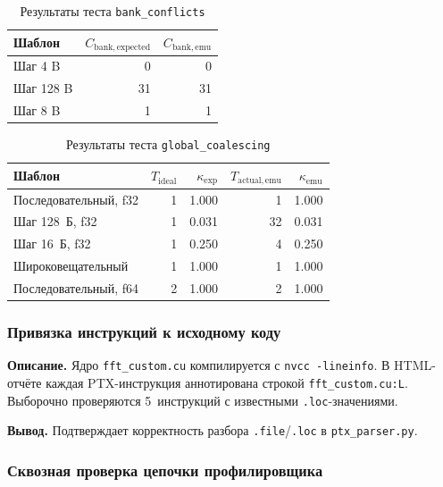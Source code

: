 \begin{table}[h]
  \caption{Результаты теста \texttt{bank\_conflicts}}
  \label{tab:bank_conflicts_test}
  \centering
  \begin{tabular}{lrr}
    \toprule
    \textbf{Шаблон} & $C_{\mathrm{bank,expected}}$ & $C_{\mathrm{bank,emu}}$ \\
    \midrule
    Шаг 4 B    & 0  & 0  \\
    Шаг 128 B  & 31 & 31 \\
    Шаг 8 B    & 1  & 1  \\
    \bottomrule
  \end{tabular}
\end{table}

\begin{table}[h]
  \caption{Результаты теста \texttt{global\_coalescing}}
  \label{tab:coalescing_test}
  \centering
  \begin{tabular}{lrrrr}
    \toprule
    \textbf{Шаблон} & $T_{\mathrm{ideal}}$ & $\kappa_{\mathrm{exp}}$ &
    $T_{\mathrm{actual,emu}}$ & $\kappa_{\mathrm{emu}}$ \\
    \midrule
    Последовательный, f32 & 1 & 1.000 & 1  & 1.000 \\
    Шаг 128~Б, f32        & 1 & 0.031 & 32 & 0.031 \\
    Шаг 16~Б, f32         & 1 & 0.250 & 4  & 0.250 \\
    Широковещательный     & 1 & 1.000 & 1  & 1.000 \\
    Последовательный, f64 & 2 & 1.000 & 2  & 1.000 \\
    \bottomrule
  \end{tabular}
\end{table}

\subsubsection{Привязка инструкций к исходному коду}

\textbf{Описание.}
Ядро \texttt{fft\_custom.cu} компилируется с \texttt{nvcc -lineinfo}.
В HTML-отчёте каждая PTX-инструкция аннотирована строкой
\texttt{fft\_custom.cu:L}. Выборочно проверяются 5~инструкций
с известными \texttt{.loc}-значениями.

\textbf{Вывод.}
Подтверждает корректность разбора \texttt{.file}/\texttt{.loc}
в \texttt{ptx\_parser.py}.

\subsubsection{Сквозная проверка цепочки профилировщика}

